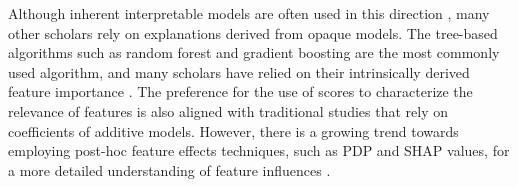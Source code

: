 Although inherent interpretable models are often used in this direction \cite{Adeodato2016DATADATAb, Martinez-Abad2020EducationalAssessment}  \cite{Gamazo2020AnTechniques}, many other scholars rely on explanations derived from opaque models. The tree-based algorithms such as random forest and gradient boosting are the most commonly used \cite{Gamazo2020AnTechniques} algorithm, and many scholars have relied on their intrinsically derived feature importance  \cite{Maia2021AssessingMethods, Rebai2020ATunisia, Masci2018StudentApproach, Lezhnina2022CombiningPISA, Chang2018ClusterEconomies, Martinez-Abad2019IdentificationApproach, Gabriel2018ALiteracy, Rodrigues2021DataExamination, KlcDepren2017IdentifyingTIMSS, Hu2022DiscoveryApproach, Chen2021SynergisticLiteracy}. The preference for the use of scores to characterize the relevance of features is also aligned with traditional studies that rely on coefficients of additive models. However, there is a growing trend towards employing post-hoc feature effects techniques, such as PDP and SHAP values, for a more detailed understanding of feature influences \cite{Lezhnina2022CombiningPISA, Masci2018StudentApproach, Rebai2020ATunisia, Schiltz2018UsingApproach}.


